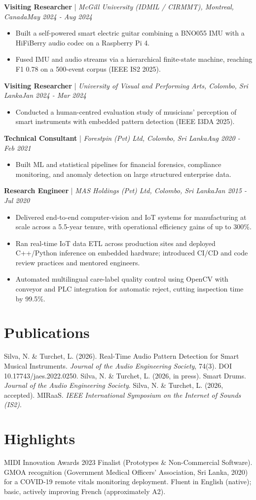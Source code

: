 \documentclass[11pt]{article}
\newenvironment{cvrole}[5]{%
  \par\noindent\textbf{\large #1} | \textit{\small #2, #3}\hfill \textit{\small #4 - #5}\par
  \begin{itemize}[leftmargin=2em, itemsep=-0.3em, topsep=-0.5em]%
}{%
  \end{itemize}\par\noindent\mbox{}\par\vspace{0.1em}%
}
\begin{document}
\begin{cvrole}{Visiting Researcher}{McGill University (IDMIL / CIRMMT)}{Montreal, Canada}{May 2024}{Aug 2024}
\item Built a self-powered smart electric guitar combining a BNO055 IMU with a HiFiBerry audio codec on a Raspberry Pi 4.
\item Fused IMU and audio streams via a hierarchical finite-state machine, reaching F1 0.78 on a 500-event corpus (IEEE IS2 2025).
\end{cvrole}

\begin{cvrole}{Visiting Researcher}{University of Visual and Performing Arts}{Colombo, Sri Lanka}{Jan 2024}{Mar 2024}
\item Conducted a human-centred evaluation study of musicians' perception of smart instruments with embedded pattern detection (IEEE I3DA 2025).
\end{cvrole}

\begin{cvrole}{Technical Consultant}{Forestpin (Pvt) Ltd}{Colombo, Sri Lanka}{Aug 2020}{Feb 2021}
\item Built ML and statistical pipelines for financial forensics, compliance monitoring, and anomaly detection on large structured enterprise data.
\end{cvrole}

\begin{cvrole}{Research Engineer}{MAS Holdings (Pvt) Ltd}{Colombo, Sri Lanka}{Jan 2015}{Jul 2020}
\item Delivered end-to-end computer-vision and IoT systems for manufacturing at scale across a 5.5-year tenure, with operational efficiency gains of up to 300\%.
\item Ran real-time IoT data ETL across production sites and deployed C++/Python inference on embedded hardware; introduced CI/CD and code review practices and mentored engineers.
\item Automated multilingual care-label quality control using OpenCV with conveyor and PLC integration for automatic reject, cutting inspection time by 99.5\%.
\end{cvrole}

\section*{Publications}
Silva, N. \& Turchet, L. (2026). Real-Time Audio Pattern Detection for Smart Musical Instruments. \textit{Journal of the Audio Engineering Society}, 74(3). DOI 10.17743/jaes.2022.0250. Silva, N. \& Turchet, L. (2026, in press). Smart Drums. \textit{Journal of the Audio Engineering Society}. Silva, N. \& Turchet, L. (2026, accepted). MIRaaS. \textit{IEEE International Symposium on the Internet of Sounds (IS2)}.

\section*{Highlights}
MIDI Innovation Awards 2023 Finalist (Prototypes \& Non-Commercial Software). GMOA recognition (Government Medical Officers' Association, Sri Lanka, 2020) for a COVID-19 remote vitals monitoring deployment. Fluent in English (native); basic, actively improving French (approximately A2).
\end{document}
